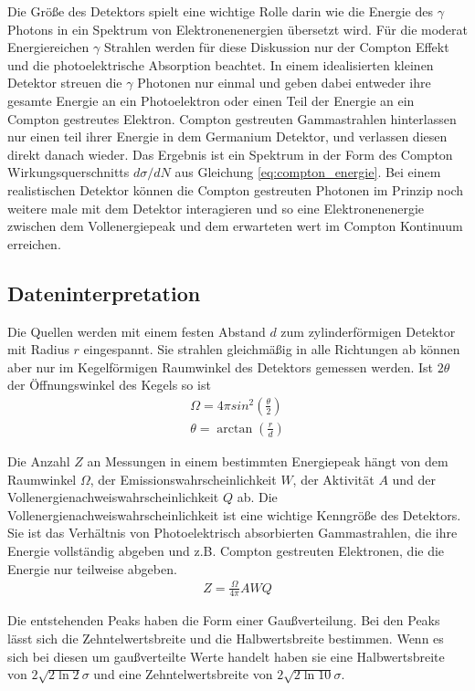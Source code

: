 Die Größe des Detektors spielt eine wichtige Rolle darin wie die Energie des
$\gamma$ Photons in ein Spektrum von Elektronenenergien übersetzt wird. Für die
moderat Energiereichen $\gamma$ Strahlen werden für diese Diskussion nur der
Compton Effekt und die photoelektrische Absorption beachtet. In einem
idealisierten kleinen Detektor streuen die $\gamma$ Photonen nur einmal und
geben dabei entweder ihre gesamte Energie an ein Photoelektron oder einen Teil
der Energie an ein Compton gestreutes Elektron. Compton gestreuten
Gammastrahlen hinterlassen nur einen teil ihrer Energie in dem Germanium
Detektor, und verlassen diesen direkt danach wieder. Das Ergebnis ist ein
Spektrum in der Form des Compton Wirkungsquerschnitts $d\sigma/dN$ aus
Gleichung \eqref{eq:compton_energie}. Bei einem realistischen Detektor können
die Compton gestreuten Photonen im Prinzip noch weitere male mit dem Detektor
interagieren und so eine Elektronenenergie zwischen dem Vollenergiepeak und dem
erwarteten wert im Compton Kontinuum erreichen.


\subsection{Dateninterpretation}

Die Quellen werden mit einem festen Abstand $d$ zum zylinderförmigen Detektor
mit Radius $r$ eingespannt. Sie strahlen gleichmäßig in alle Richtungen ab
können aber nur im Kegelförmigen Raumwinkel des Detektors gemessen werden. Ist
$2\theta$ der Öffnungswinkel des Kegels so ist \cite{wiki:raum}
\begin{align}
	\Omega = 4 \pi sin^2\left(\frac{\theta}{2}\right) \\
	\theta = \arctan \left(\frac{r}{d} \right)
\end{align}\label{eq:raumwinkel}

Die Anzahl $Z$ an Messungen in einem bestimmten Energiepeak hängt von dem
Raumwinkel $\Omega$, der Emissionswahrscheinlichkeit $W$, der Aktivität $A$ und
der Vollenergienachweiswahrscheinlichkeit $Q$ ab. Die
Vollenergienachweiswahrscheinlichkeit ist eine wichtige Kenngröße des
Detektors. Sie ist das Verhältnis von Photoelektrisch absorbierten
Gammastrahlen, die ihre Energie vollständig abgeben und z.B. Compton
gestreuten Elektronen, die die Energie nur teilweise abgeben.
\begin{align}
	Z = \frac{\Omega}{4\pi} A W Q
	\label{eq:Q}
\end{align}

Die entstehenden Peaks haben die Form einer Gaußverteilung. Bei den Peaks lässt
sich die Zehntelwertsbreite und die Halbwertsbreite bestimmen. Wenn es sich bei
diesen um gaußverteilte Werte handelt haben sie eine Halbwertsbreite von
$2\sqrt{2\ln 2} \sigma$ und eine Zehntelwertsbreite von $2 \sqrt{2\ln
		10}\sigma$.







